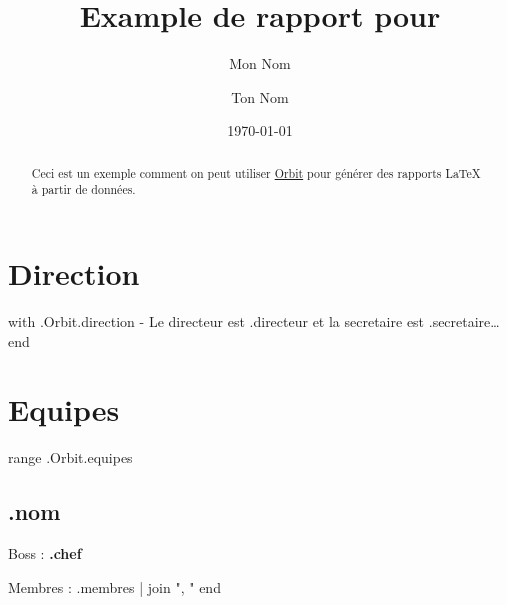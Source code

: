 \documentclass[11pt,twoside,openright]{report} %
\title{Example de rapport pour \og {{.Orbit.config.labo}} \fg}
\author{Mon Nom \and Ton Nom}
\date{\today}
\begin{document}
\maketitle

\begin{abstract}
  Ceci est un exemple comment on peut utiliser \href{https://github.com/gulien/orbit}{Orbit} pour générer des rapports \LaTeX{} à partir de données.
\end{abstract}


\section{Direction}

{{with .Orbit.direction -}}
  Le directeur est {{.directeur}} et la secretaire est {{.secretaire}}\dots
{{end}}

\section{Equipes}

{{range .Orbit.equipes}}
  \subsection{ {{.nom}} }

  Boss : \textbf{ {{.chef}} }

  Membres :
    {{.membres | join ", "}}
{{end}}

\end{document}
